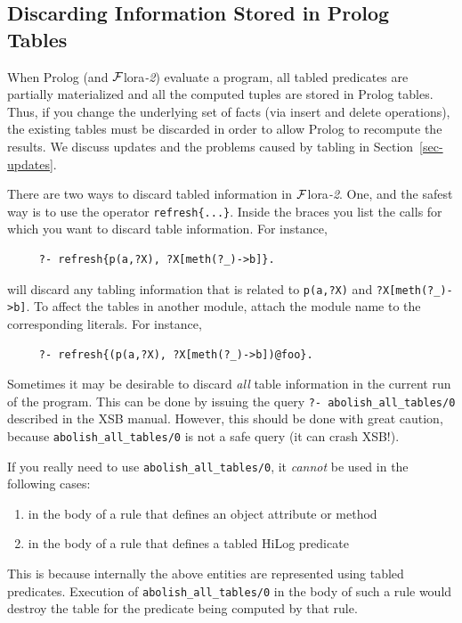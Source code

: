 \documentclass[11pt]{article}
\newcommand{\FLORA}{{\mbox{\sc ${\cal F}${lora}\rm\emph{-2}}}\xspace}
\begin{document}
\subsection{Discarding Information Stored in Prolog Tables}

When Prolog (and \FLORA) evaluate a program, all tabled predicates are
partially materialized and all the computed tuples are stored in Prolog
tables. Thus, if you change the underlying set of facts (via insert and
delete operations), the existing tables must be discarded in order to allow
Prolog to recompute the results.  We discuss updates and the problems
caused by tabling in Section~\ref{sec-updates}.

There are two ways to discard tabled information in \FLORA. One, and the
safest way is to use the operator {\tt refresh\{...\}}. Inside the braces
you list the calls for which you want to discard table information.  For
instance,
\begin{verbatim}
     ?- refresh{p(a,?X), ?X[meth(?_)->b]}.
\end{verbatim}
will discard any tabling information that is related to   {\tt p(a,?X)}
and {\tt ?X[meth(?\_)->b]}.
To affect the tables in another module, attach the module name to the
corresponding literals. For instance,
\begin{verbatim}
     ?- refresh{(p(a,?X), ?X[meth(?_)->b])@foo}.
\end{verbatim}

Sometimes it may be desirable to discard \emph{all} table information in the
current run of the program.
This can be done by issuing the
query {\tt ?- abolish\_all\_tables/0} described in the XSB manual.
However, this should be done with great caution, because
{\tt abolish\_all\_tables/0} is not a safe query (it can crash XSB!).

If you really need to use {\tt abolish\_all\_tables/0}, it \emph{cannot} be
used in the following cases:
\begin{enumerate}
  \item  in the body of a rule that defines an object attribute or method
  \item  in the body of a rule that defines a tabled HiLog predicate
\end{enumerate}
This is because internally the above entities are represented using tabled
predicates. Execution of {\tt abolish\_all\_tables/0} in the body of such a
rule would destroy the table for the predicate being computed by that rule.
\end{document}
